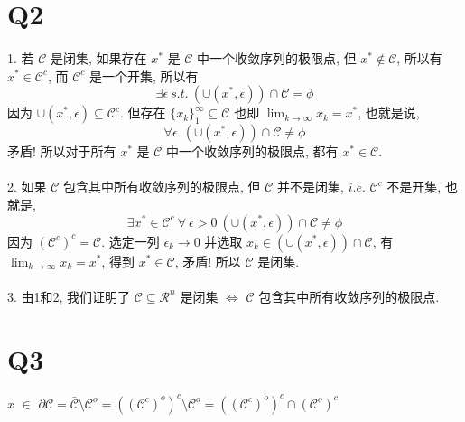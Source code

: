 \documentclass{article}
\begin{document}
\begin{CJK}{UTF8}{gbsn}
\section{Q2}
  \paragraph{}
    1. 若 $\mathcal{C}$ 是闭集, 如果存在 $x^*$ 是 $\mathcal{C}$ 中一个收敛序列的极限点, 但 $x^* \not\in \mathcal{C}$, 所以有 $x^* \in \mathcal{C}^c$, 而 $\mathcal{C}^c$ 是一个开集, 所以有
    \begin{equation}
      \exists \epsilon\ s.t.\ (\cup(x^*, \epsilon)) \cap \mathcal{C} = \phi
    \end{equation}
    因为 $\cup(x^*, \epsilon) \subseteq \mathcal{C}^c$. 但存在 $\{x_k\}_1^{\infty} \subseteq \mathcal{C}$ 也即 $\lim_{k \to \infty} x_k = x^*$, 也就是说,
    \begin{equation}
      \forall \epsilon\ \ (\cup(x^*, \epsilon)) \cap \mathcal{C} \not= \phi
    \end{equation}
    矛盾! 所以对于所有 $x^*$ 是 $\mathcal{C}$ 中一个收敛序列的极限点, 都有 $x^* \in \mathcal{C}$.
    \paragraph{}
      2. 如果 $\mathcal{C}$ 包含其中所有收敛序列的极限点, 但 $\mathcal{C}$ 并不是闭集, $i.e.$ $\mathcal{C}^c$ 不是开集, 也就是,
      \begin{equation}
        \exists x^* \in \mathcal{C}^c\ \forall\ \epsilon > 0\ (\cup(x^*, \epsilon)) \cap \mathcal{C} \not= \phi
      \end{equation}
      因为 $(\mathcal{C}^c)^c = \mathcal{C}$. 选定一列 $\epsilon_k \to 0$ 并选取 $x_k \in (\cup(x^*, \epsilon)) \cap \mathcal{C}$, 有 $\lim_{k \to \infty} x_k = x^*$, 得到 $x^* \in \mathcal{C}$, 矛盾! 所以 $\mathcal{C}$ 是闭集.
    \paragraph{}
      3. 由1和2, 我们证明了 $\mathcal{C} \subseteq \mathcal{R}^n$ 是闭集 $\iff$ $\mathcal{C}$ 包含其中所有收敛序列的极限点.

\section{Q3}
  \paragraph{}
  $x$ $\in$ $\partial\mathcal{C} = \bar{\mathcal{C}} \setminus \mathcal{C}^o = ((\mathcal{C}^c)^o)^c \setminus \mathcal{C}^o = ((\mathcal{C}^c)^o)^c \cap (\mathcal{C}^o)^c$

\end{CJK}
\end{document}
